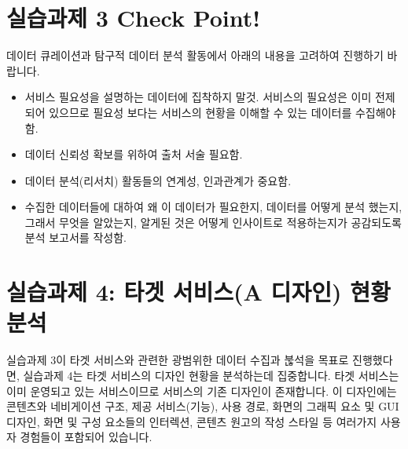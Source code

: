 \documentclass[
  letterpaper,
]{book}
\providecommand{\tightlist}{%
  \setlength{\itemsep}{0pt}\setlength{\parskip}{0pt}}\usepackage{longtable,booktabs,array}
\begin{document}
\section{실습과제 3 Check
Point!}\label{uxc2e4uxc2b5uxacfcuxc81c-3-check-point}

데이터 큐레이션과 탐구적 데이터 분석 활동에서 아래의 내용을 고려하여
진행하기 바랍니다.

\begin{itemize}
\tightlist
\item
  서비스 필요성을 설명하는 데이터에 집착하지 말것. 서비스의 필요성은
  이미 전제되어 있으므로 필요성 보다는 서비스의 현황을 이해할 수 있는
  데이터를 수집해야함.
\item
  데이터 신뢰성 확보를 위하여 출처 서술 필요함.
\item
  데이터 분석(리서치) 활동들의 연계성, 인과관계가 중요함.
\item
  수집한 데이터들에 대하여 왜 이 데이터가 필요한지, 데이터를 어떻게 분석
  했는지, 그래서 무엇을 알았는지, 알게된 것은 어떻게 인사이트로
  적용하는지가 공감되도록 분석 보고서를 작성함.
\end{itemize}

\section{실습과제 4: 타겟 서비스(A 디자인) 현황
분석}\label{uxc2e4uxc2b5uxacfcuxc81c-4-uxd0c0uxac9f-uxc11cuxbe44uxc2a4a-uxb514uxc790uxc778-uxd604uxd669-uxbd84uxc11d}

실습과제 3이 타겟 서비스와 관련한 광범위한 데이터 수집과 붆석을 목표로
진행했다면, 실습과제 4는 타겟 서비스의 디자인 현황을 분석하는데
집중합니다. 타겟 서비스는 이미 운영되고 있는 서비스이므로 서비스의 기존
디자인이 존재합니다. 이 디자인에는 콘텐츠와 네비게이션 구조, 제공
서비스(기능), 사용 경로, 화면의 그래픽 요소 및 GUI 디자인, 화면 및 구성
요소들의 인터렉션, 콘텐츠 원고의 작성 스타일 등 여러가지 사용자 경험들이
포함되어 있습니다.
\end{document}
